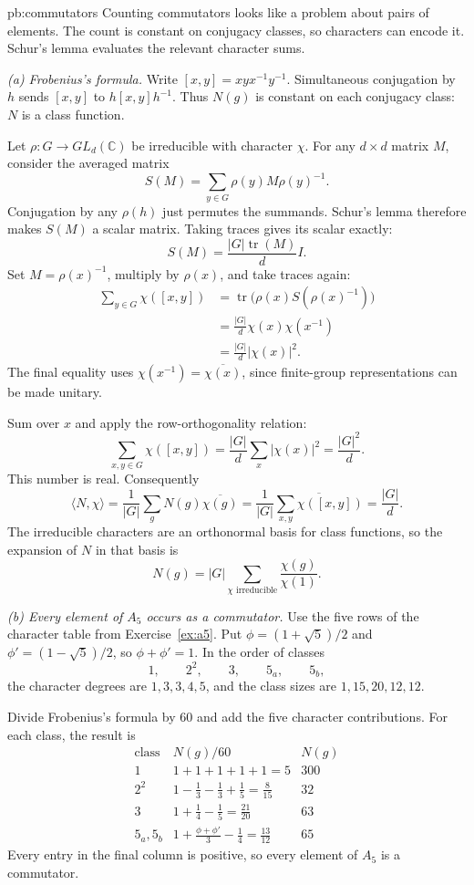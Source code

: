 \begin{solution}{pb:commutators}
\idea Counting commutators looks like a problem about pairs of elements. The count is constant on conjugacy classes, so characters can encode it. Schur's lemma evaluates the relevant character sums.

\writeup \emph{(a) Frobenius's formula.}
Write $[x,y]=xyx^{-1}y^{-1}$. Simultaneous conjugation by $h$ sends $[x,y]$ to $h[x,y]h^{-1}$. Thus $N(g)$ is constant on each conjugacy class: $N$ is a class function.

Let $\rho:G\to GL_d(\mathbb C)$ be irreducible with character $\chi$. For any $d\times d$ matrix $M$, consider the averaged matrix
\[
S(M)=\sum_{y\in G}\rho(y)M\rho(y)^{-1}.
\]
Conjugation by any $\rho(h)$ just permutes the summands. Schur's lemma therefore makes $S(M)$ a scalar matrix. Taking traces gives its scalar exactly:
\[
S(M)=\frac{|G|\operatorname{tr}(M)}d I.
\]
Set $M=\rho(x)^{-1}$, multiply by $\rho(x)$, and take traces again:
\[
\begin{aligned}
\sum_{y\in G}\chi([x,y])
&=\operatorname{tr}\bigl(\rho(x)S(\rho(x)^{-1})\bigr)\\
&=\frac{|G|}d\chi(x)\chi(x^{-1})\\
&=\frac{|G|}d|\chi(x)|^2.
\end{aligned}
\]
The final equality uses $\chi(x^{-1})=\overline{\chi(x)}$, since finite-group representations can be made unitary.

Sum over $x$ and apply the row-orthogonality relation:
\[
\sum_{x,y\in G}\chi([x,y])
=\frac{|G|}d\sum_x|\chi(x)|^2
=\frac{|G|^2}d.
\]
This number is real. Consequently
\[
\langle N,\chi\rangle
=\frac1{|G|}\sum_g N(g)\overline{\chi(g)}
=\frac1{|G|}\overline{\sum_{x,y}\chi([x,y])}
=\frac{|G|}d.
\]
The irreducible characters are an orthonormal basis for class functions, so the expansion of $N$ in that basis is
\[
\boxed{N(g)=|G|\sum_{\chi\text{ irreducible}}
                \frac{\chi(g)}{\chi(1)}.}
\]

\emph{(b) Every element of $A_5$ occurs as a commutator.}
Use the five rows of the character table from Exercise~\ref{ex:a5}. Put $\phi=(1+\sqrt5)/2$ and $\phi'=(1-\sqrt5)/2$, so $\phi+\phi'=1$. In the order of classes
\[
1,\qquad 2^2,\qquad 3,\qquad5_a,\qquad5_b,
\]
the character degrees are $1,3,3,4,5$, and the class sizes are $1,15,20,12,12$.

Divide Frobenius's formula by $60$ and add the five character contributions. For each class, the result is
\[
\begin{array}{c|c|c}
\text{class}&N(g)/60&N(g)\\\hline
1&1+1+1+1+1=5&300\\
2^2&1-\frac13-\frac13+\frac15=\frac8{15}&32\\
3&1+\frac14-\frac15=\frac{21}{20}&63\\
5_a,5_b&1+\frac{\phi+\phi'}{3}-\frac14
=\frac{13}{12}&65
\end{array}
\]
Every entry in the final column is positive, so every element of $A_5$ is a commutator.


\end{solution}
